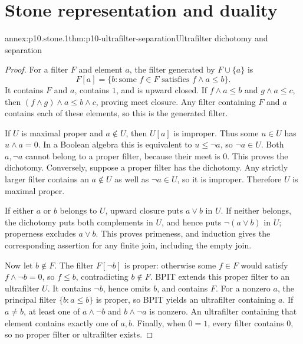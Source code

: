 
\section{Stone representation and duality}

\begin{annexitem}{annex:p10.stone.1}{thm:p10-ultrafilter-separation}{Ultrafilter dichotomy and separation}
\begin{proof}
For a filter \(F\) and element \(a\), the filter generated by
\(F\cup\{a\}\) is
\[
 F[a]=\{b:\text{some }f\in F\text{ satisfies }f\wedge a\leq b\}.
\]
It contains \(F\) and \(a\), contains \(1\), and is upward closed.
If \(f\wedge a\leq b\) and \(g\wedge a\leq c\), then
\((f\wedge g)\wedge a\leq b\wedge c\), proving meet closure.
Any filter containing \(F\) and \(a\) contains each of these elements,
so this is the generated filter.

If \(U\) is maximal proper and \(a\notin U\), then \(U[a]\) is
improper. Thus some \(u\in U\) has \(u\wedge a=0\).
In a Boolean algebra this is equivalent to \(u\leq\neg a\), so
\(\neg a\in U\).
Both \(a,\neg a\) cannot belong to a proper filter, because their
meet is \(0\). This proves the dichotomy.
Conversely, suppose a proper filter has the dichotomy.
Any strictly larger filter contains an \(a\notin U\) as well as
\(\neg a\in U\), so it is improper. Therefore \(U\) is maximal proper.

If either \(a\) or \(b\) belongs to \(U\), upward closure puts
\(a\vee b\) in \(U\).
If neither belongs, the dichotomy puts both complements in \(U\),
and hence puts \(\neg(a\vee b)\) in \(U\); properness excludes
\(a\vee b\). This proves primeness, and induction gives the
corresponding assertion for any finite join, including the empty join.

Now let \(b\notin F\). The filter \(F[\neg b]\) is proper:
otherwise some \(f\in F\) would satisfy \(f\wedge\neg b=0\),
so \(f\leq b\), contradicting \(b\notin F\).
BPIT extends this proper filter to an ultrafilter \(U\).
It contains \(\neg b\), hence omits \(b\), and contains \(F\).
For a nonzero \(a\), the principal filter
\(\{b:a\leq b\}\) is proper, so BPIT yields an ultrafilter containing
\(a\). If \(a\ne b\), at least one of
\(a\wedge\neg b\) and \(b\wedge\neg a\) is nonzero.
An ultrafilter containing that element contains exactly one of \(a,b\).
Finally, when \(0=1\), every filter contains \(0\), so no proper
filter or ultrafilter exists.
\end{proof}
\end{annexitem}

